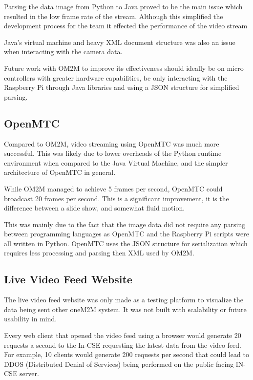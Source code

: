 Parsing the data image from Python to Java proved to be the main issue which resulted in the low frame rate of the stream. Although this simplified the development process for the team it effected the performance of the video stream

Java's virtual machine and heavy XML document structure was also an issue when interacting with the camera data.

Future work with OM2M to improve its effectiveness should ideally be on micro controllers with greater hardware capabilities, be only interacting with the Raspberry Pi through Java libraries and using a JSON structure for simplified parsing. 

\subsection{OpenMTC}

Compared to OM2M, video streaming using OpenMTC was much more successful. This was likely due to lower overheads of the Python runtime environment when compared to the Java Virtual Machine, and the simpler architecture of OpenMTC in general.

While OM2M managed to achieve 5 frames per second, OpenMTC could broadcast 20 frames per second. This is a significant improvement, it is the difference between a slide show, and somewhat fluid motion.

This was mainly due to the fact that the image data did not require any parsing between programming languages as OpenMTC and the Raspberry Pi scripts were all written in Python. OpenMTC uses the JSON structure for serialization which requires less processing and parsing then XML used by OM2M.    

\subsection{Live Video Feed Website}

The live video feed website was only made as a testing platform to visualize the data being sent other oneM2M system. It was not built with scalability or future usability in mind.

Every web client that opened the video feed using a browser would generate 20 requests a second to the In-CSE requesting the latest data from the video feed. For example, 10 clients would generate 200 requests per second that could lead to DDOS (Distributed Denial of Services) being performed on the public facing IN-CSE server.

